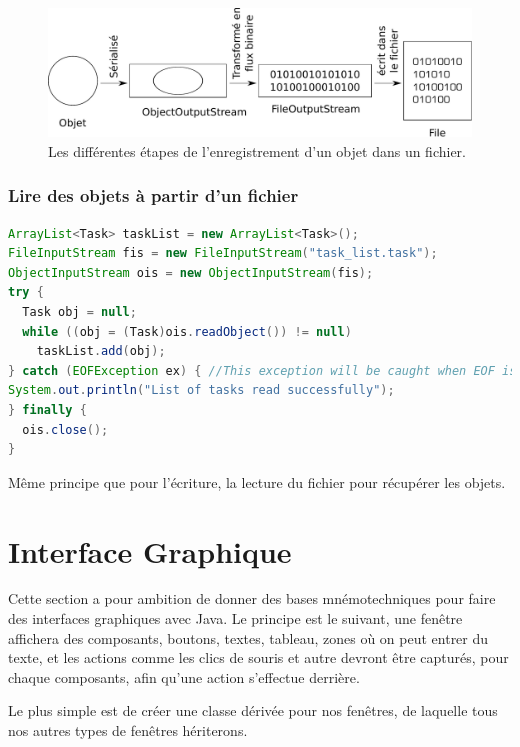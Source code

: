 \documentclass[a4paper,twoside]{article}
\begin{document}
\begin{figure}[htb]
\centering
\includegraphics[width=0.65\linewidth]{figures/serialisation.pdf}
\caption{Les différentes étapes de l'enregistrement d'un objet dans un fichier.}
\end{figure}

\subsubsection{Lire des objets à partir d'un fichier}
\begin{lstlisting}[language=java]
ArrayList<Task> taskList = new ArrayList<Task>();
FileInputStream fis = new FileInputStream("task_list.task"); 
ObjectInputStream ois = new ObjectInputStream(fis);
try {
  Task obj = null;
  while ((obj = (Task)ois.readObject()) != null) 
    taskList.add(obj);
} catch (EOFException ex) { //This exception will be caught when EOF is reached
System.out.println("List of tasks read successfully");
} finally {
  ois.close();
}
\end{lstlisting}

Même principe que pour l'écriture, la lecture du fichier pour récupérer les objets. 

\section{Interface Graphique}
Cette section a pour ambition de donner des bases mnémotechniques pour faire des interfaces graphiques avec Java. 
Le principe est le suivant, une fenêtre affichera des composants, boutons, textes, tableau, zones où on peut entrer du texte, et les actions comme les clics de souris et autre devront être capturés, pour chaque composants, afin qu'une action s'effectue derrière. 

Le plus simple est de créer une classe dérivée pour nos fenêtres, de laquelle tous nos autres types de fenêtres hériterons. 
\end{document}
